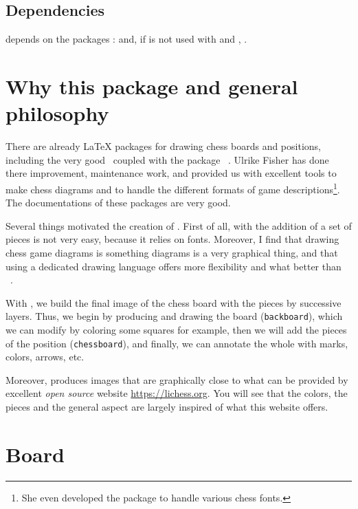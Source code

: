 \documentclass[english]{ltxdoc}
\begin{document}
\subsection{Dependencies}


\mpchess depends on the packages \MP:  and, if
\mpchess is not used with  and ,
.


\section{Why this package and general philosophy}

There are already \LaTeX{} packages for drawing chess boards and positions,
including the very good ~\cite{ctan-xskak}coupled with the
package ~\cite{ctan-chessboard}. 
Ulrike Fisher has done there improvement, maintenance work, and provided us with
excellent tools to make chess diagrams and to handle the different formats of
game descriptions\footnote{She even developed the
package to handle various chess fonts.}. The
documentations of these packages are very good.

Several things motivated the creation of \mpchess. First of all, with
 the addition of a set of pieces is not very easy, because
it relies on fonts. Moreover, I find that drawing chess game diagrams is
something diagrams is a very graphical thing, and that using a dedicated drawing
language offers more flexibility and what better than \MP~\cite{ctan-metapost}.

With \mpchess, we build the final image of the chess board with the pieces
by successive layers. Thus, we begin by producing and drawing the board
(\lstinline+backboard+), which we can modify by coloring some squares for
example, then we will add the pieces of the position (\lstinline+chessboard+),
and finally, we can annotate the whole with marks, colors, arrows, etc. 



Moreover, \mpchess produces images that are graphically close to what can be
provided by excellent  \emph{open source} website \url{https://lichess.org}. You
will see that the colors, the pieces and the general aspect are largely inspired
of what this website offers.

\section{Board}
\end{document}
